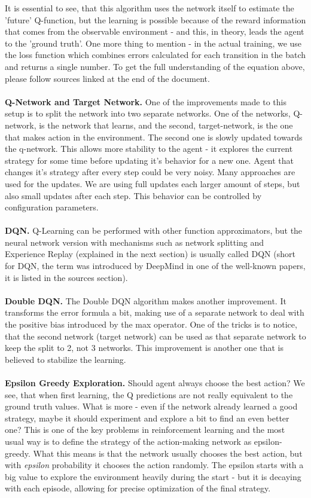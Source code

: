 \documentclass{article}
\begin{document}
It is essential to see, that this algorithm uses the network itself to estimate the 'future' Q-function, but the learning is possible because of the reward information that comes from the observable environment - and this, in theory, leads the agent to the 'ground truth'. One more thing to mention - in the actual training, we use the loss function which combines errors calculated for each transition in the batch and returns a single number. To get the full understanding of the equation above, please follow sources linked at the end of the document. 
\\\\
\textbf{Q-Network and Target Network.} One of the improvements made to this setup is to split the network into two separate networks. One of the networks, Q-network, is the network that learns, and the second, target-network, is the one that makes action in the environment. The second one is slowly updated towards the q-network. This allows more stability to the agent - it explores the current strategy for some time before updating it's behavior for a new one. Agent that changes it's strategy after every step could be very noisy. Many approaches are used for the updates. We are using full updates each larger amount of steps, but also small updates after each step. This behavior can be controlled by configuration parameters.
\\\\
\textbf{DQN.} Q-Learning can be performed with other function approximators, but the neural network version with mechanisms such as network splitting and Experience Replay (explained in the next section) is usually called DQN (short for DQN, the term was introduced by DeepMind in one of the well-known papers, it is listed in the sources section).
\\\\
\textbf{Double DQN.} The Double DQN algorithm makes another improvement. It transforms the error formula a bit, making use of a separate network to deal with the positive bias introduced by the max operator. One of the tricks is to notice, that the second network (target network) can be used as that separate network to keep the split to 2, not 3 networks. This improvement is another one that is believed to stabilize the learning.
\\\\
\textbf{Epsilon Greedy Exploration.} Should agent always choose the best action? We see, that when first learning, the Q predictions are not really equivalent to the ground truth values. What is more - even if the network already learned a good strategy, maybe it should experiment and explore a bit to find an even better one? This is one of the key problems in reinforcement learning and the most usual way is to define the strategy of the action-making network as epsilon-greedy. What this means is that the network usually chooses the best action, but with \textit{epsilon} probability it chooses the action randomly. The epsilon starts with a big value to explore the environment heavily during the start - but it is decaying with each episode, allowing for precise optimization of the final strategy.
\end{document}
